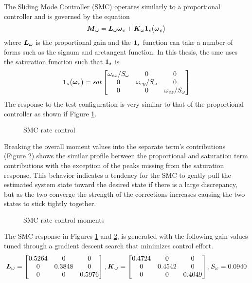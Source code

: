 The Sliding Mode Controller (SMC) operates similarly to a proportional controller and is governed by the equation
\begin{equation}
  \boldsymbol{M}_{\omega} = \boldsymbol{L}_{\omega} \boldsymbol{\omega}_e + \boldsymbol{K}_{\omega}\boldsymbol{1}_s \big(\boldsymbol{\omega}_e \big)
  \label{eqn:SMController}
\end{equation}
where $\boldsymbol{L}_{\omega}$ is the proportional gain and the $\boldsymbol{1}_s$ function can take a number of forms such as the signum and arctangent function.  In this thesis, the smc uses the saturation function such that $\boldsymbol{1}_s$ is
\begin{equation}
  \boldsymbol{1}_s \big(\boldsymbol{\omega}_e \big) = sat \begin{bmatrix} \omega_{ex} / S_{\omega} &0 &0 \\ 0 & \omega_{ey} / S_{\omega} & 0 \\ 0 & 0 & \omega_{ez} / S_{\omega} \end{bmatrix}
\end{equation}
The response to the test configuration is very similar to that of the proportional controller as shown if Figure \ref{fig:SMCRateControl}.
\begin{figure}[H]
  \centerline{}
  \caption{SMC rate control}
  \label{fig:SMCRateControl}
\end{figure}
Breaking the overall moment values into the separate term's contributions (Figure \ref{fig:SMCRateControlMoments}) shows the similar profile between the proportional and saturation term contributions with the exception of the peaks missing from the saturation response.  This behavior indicates a tendency for the SMC to gently pull the estimated system state toward the desired state if there is a large discrepancy, but as the two converge the strength of the corrections increases causing the two states to stick tightly together.
\begin{figure}[H]
  \centerline{}
  \caption{SMC rate control moments}
  \label{fig:SMCRateControlMoments}
\end{figure}
The SMC response in Figures \ref{fig:SMCRateControl} and \ref{fig:SMCRateControlMoments}, is generated with the following gain values tuned through a gradient descent search that minimizes control effort.
\begin{equation}
    \boldsymbol{L}_{\omega} = \begin{bmatrix} 0.5264 & 0 & 0 \\ 0 & 0.3848 & 0 \\ 0 & 0 & 0.5976 \end{bmatrix},
    \boldsymbol{K}_{\omega} = \begin{bmatrix} 0.4724 & 0 & 0 \\ 0 & 0.4542 & 0 \\ 0 & 0 & 0.4049 \end{bmatrix},
    S_{\omega} = 0.0940
  \label{SMCRateControlGains}
\end{equation}

